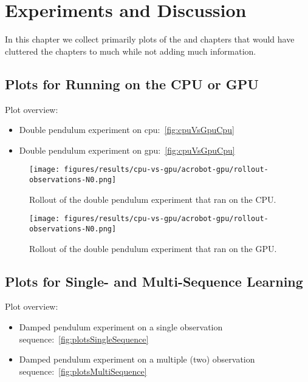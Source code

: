 \chapter{Experiments and Discussion}



In this chapter we collect primarily plots of the  and  chapters that would have cluttered the chapters to much while not adding much information.

\section{Plots for Running on the CPU or GPU}
	\label{app:plotsCpuGpu}

	Plot overview:
	\begin{itemize}
		\item Double pendulum experiment on \ac{cpu}:~\autoref{fig:cpuVsGpuCpu}
		\item Double pendulum experiment on \ac{gpu}:~\autoref{fig:cpuVsGpuCpu}
	\end{itemize}

	\begin{figure}
		\centering
		\texttt{[image: figures/results/cpu-vs-gpu/acrobot-gpu/rollout-observations-N0.png]}
		\caption[Rollout of the double pendulum experiment that ran on the CPU]{Rollout of the double pendulum experiment that ran on the CPU.}
		\label{fig:cpuVsGpuCpu}
	\end{figure}
	\begin{figure}
		\centering
		\texttt{[image: figures/results/cpu-vs-gpu/acrobot-gpu/rollout-observations-N0.png]}
		\caption[Rollout of the double pendulum experiment that ran on the GPU]{Rollout of the double pendulum experiment that ran on the GPU.}
		\label{fig:cpuVsGpuGpu}
	\end{figure}

\section{Plots for Single- and Multi-Sequence Learning}
	\label{app:plotsSingleMulti}

	Plot overview:
	\begin{itemize}
		\item Damped pendulum experiment on a single observation sequence:~\autoref{fig:plotsSingleSequence}
		\item Damped pendulum experiment on a multiple (two) observation sequence:~\autoref{fig:plotsMultiSequence}
	\end{itemize}

